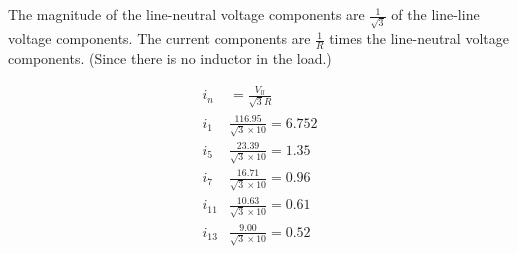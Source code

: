 \subsection{}

The magnitude of the line-neutral voltage components are $\frac{1}{\sqrt{3}}$ of the line-line voltage components.
The current components are $\frac{1}{R}$ times the line-neutral voltage components. (Since there is no inductor in the load.)

\begin{align*}
i_n & = \frac{V_{ll}}{\sqrt{3}R} \\
i_1 & \frac{116.95}{\sqrt{3} \times 10} = 6.752 \\
i_5 & \frac{23.39}{\sqrt{3} \times 10} = 1.35 \\
i_7 & \frac{16.71}{\sqrt{3} \times 10} = 0.96 \\
i_{11} & \frac{10.63}{\sqrt{3} \times 10} = 0.61 \\
i_{13} & \frac{9.00}{\sqrt{3} \times 10} = 0.52 \\
\end{align*}